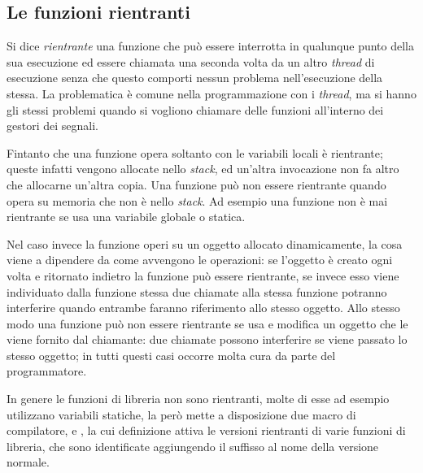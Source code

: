 \subsection{Le funzioni rientranti}
\label{sec:proc_reentrant}


Si dice \textsl{rientrante} una funzione che può essere interrotta in
qualunque punto della sua esecuzione ed essere chiamata una seconda volta da
un altro \textit{thread} di esecuzione senza che questo comporti nessun
problema nell'esecuzione della stessa. La problematica è comune nella
programmazione con i \textit{thread}, ma si hanno gli stessi problemi quando
si vogliono chiamare delle funzioni all'interno dei gestori dei segnali.

Fintanto che una funzione opera soltanto con le variabili locali è rientrante;
queste infatti vengono allocate nello \textit{stack}, ed un'altra invocazione
non fa altro che allocarne un'altra copia. Una funzione può non essere
rientrante quando opera su memoria che non è nello \textit{stack}.  Ad esempio
una funzione non è mai rientrante se usa una variabile globale o statica.

Nel caso invece la funzione operi su un oggetto allocato dinamicamente, la
cosa viene a dipendere da come avvengono le operazioni: se l'oggetto è creato
ogni volta e ritornato indietro la funzione può essere rientrante, se invece
esso viene individuato dalla funzione stessa due chiamate alla stessa funzione
potranno interferire quando entrambe faranno riferimento allo stesso oggetto.
Allo stesso modo una funzione può non essere rientrante se usa e modifica un
oggetto che le viene fornito dal chiamante: due chiamate possono interferire
se viene passato lo stesso oggetto; in tutti questi casi occorre molta cura da
parte del programmatore.

In genere le funzioni di libreria non sono rientranti, molte di esse ad
esempio utilizzano variabili statiche, la  però mette a
disposizione due macro di compilatore,  e
, la cui definizione attiva le versioni rientranti di
varie funzioni di libreria, che sono identificate aggiungendo il suffisso
 al nome della versione normale.



